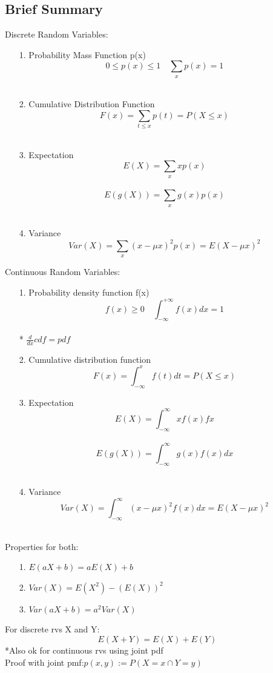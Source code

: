 \documentclass{article}
\begin{document}
\subsection{Brief Summary}
Discrete Random Variables:
\begin{itemize}
    \item [1.] Probability Mass Function p(x)\\
    \[0 \leq p(x) \leq 1 \quad \sum_{x} p(x) =1\]\\
    \item[2.] Cumulative Distribution Function \\
    \[F(x) = \sum_{t\leq x} p(t) = P(X \leq x)\]\\
    \item[3.] Expectation\\
    \[E(X) = \sum_{x} xp(x)\]\\
    \[E(g(X))=\sum_{x}g(x)p(x)\]\\
    \item[4.] Variance\\
    \[Var(X) = \sum_{x}(x-\mu x)^2p(x) = E(X-\mu x)^2\]
\end{itemize}
Continuous Random Variables:
\begin{itemize}
    \item [1.] Probability density function f(x)\\
    \[f(x) \geq 0 \quad \int_{-\infty}^{+\infty} f(x) dx =1\]\\
    * $\frac{d}{dx}cdf=pdf$
    \item [2.] Cumulative distribution function \\
    \[F(x)=\int_{-\infty}^x f(t)dt = P(X \leq x)\]
    \item[3.] Expectation\\
    \[E(X) = \int_{-\infty}^{\infty}xf(x)fx\]\\
    \[E(g(X)) = \int_{-\infty}^{\infty}g(x)f(x)dx\]\\
    \item[4.] Variance \\
    \[Var(X) = \int_{-\infty}^{\infty}(x-\mu x)^2f(x)dx = E(X-\mu x)^2\]\\
\end{itemize}
Properties for both:
\begin{itemize}
    \item [1.] $E(aX+b) = aE(X)+b$
    \item[2.] $Var(X) = E(X^2)-(E(X))^2$
    \item[3.] $Var(aX+b) = a^2 Var(X)$
\end{itemize}
For discrete rvs X and Y:
\[E(X+Y)=E(X)+E(Y)\]
*Also ok for continuous rvs using joint pdf\\
Proof with joint pmf:$p(x,y):= P({X =x} \cap {Y=y})$\\
\end{document}
